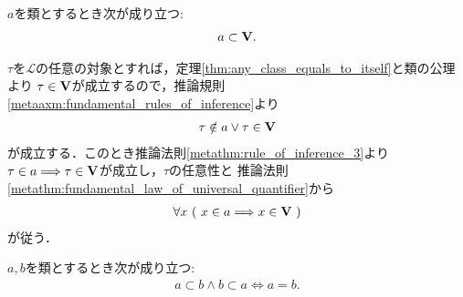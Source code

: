 	\begin{screen}
		\begin{thm}
			$a$を類とするとき次が成り立つ:
			\begin{align}
				a \subset \mathbf{V}.
			\end{align}
		\end{thm}
	\end{screen}
	
	\begin{prf}
		$\tau$を$\mathcal{L}$の任意の対象とすれば，定理\ref{thm:any_class_equals_to_itself}と類の公理より
		$\tau \in \mathbf{V}$が成立するので，推論規則\ref{metaaxm:fundamental_rules_of_inference}より
		\begin{align}
			\tau \notin a \vee \tau \in \mathbf{V}
		\end{align}
		が成立する．このとき推論法則\ref{metathm:rule_of_inference_3}より
		$\tau \in a \Longrightarrow \tau \in \mathbf{V}$が成立し，$\tau$の任意性と
		推論法則\ref{metathm:fundamental_law_of_universal_quantifier}から
		\begin{align}
			\forall x\ (\ x \in a \Longrightarrow x \in \mathbf{V}\ )
		\end{align}
		が従う．
		\QED
	\end{prf}
	
	\begin{screen}
		\begin{thm}[互いに互いの部分類となる類同士は等しい]\label{thm:mutually_sub_classes_are_equivalent}
			$a,b$を類とするとき次が成り立つ:
			\begin{align}
				a \subset b \wedge b \subset a \Longleftrightarrow a = b.
			\end{align}
		\end{thm}
	\end{screen}
	

